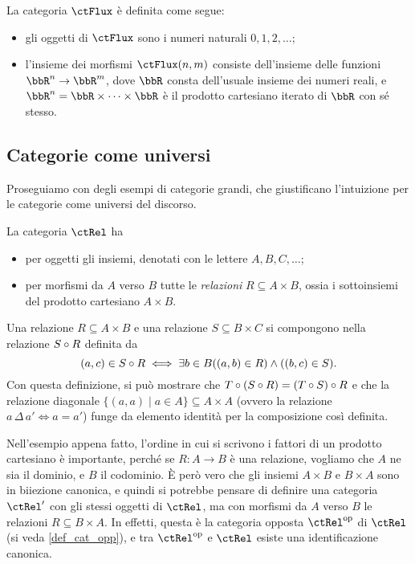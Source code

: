 \begin{example}\label{ex_cat_flusso}
	La categoria \(\ctFlux\) è definita come segue:
	\begin{itemize}
		\item gli oggetti di \(\ctFlux\) sono i numeri naturali \(0,1,2,\dots\);
		\item l'insieme dei morfismi \(\ctFlux(n,m)\) consiste dell'insieme delle funzioni \(\bbR^n\to \bbR^m\), dove \(\bbR\) consta dell'usuale insieme dei numeri reali, e \(\bbR^n = \bbR\times\dots\times\bbR\) è il prodotto cartesiano iterato di \(\bbR\) con sé stesso.
	\end{itemize}
\end{example}
\subsection{Categorie come universi}\label{ssec:categorie_universi}
Proseguiamo con degli esempi di categorie grandi, che giustificano l'intuizione per le categorie come universi del discorso.
\begin{example}\label{ex_cat_rels}
	La categoria \(\ctRel\) ha
	\begin{itemize}
		\item per oggetti gli insiemi, denotati con le lettere \(A,B,C,\dots\);
		\item per morfismi da \(A\) verso \(B\) tutte le \emph{relazioni} \(R\subseteq A\times B\), ossia i sottoinsiemi del prodotto cartesiano \(A\times B\).
	\end{itemize}
	Una relazione \(R\subseteq A\times B\) e una relazione \(S\subseteq B\times C\) si compongono nella relazione \(S\circ R\) definita da
	\[(a,c)\in S\circ R\iff \exists b\in B ((a,b)\in R)\land ((b,c)\in S).\]
	Con questa definizione, si può mostrare che \(T\circ(S\circ R)=(T\circ S)\circ R\) e che la relazione diagonale \(\{(a,a)\mid a\in A\}\subseteq A\times A\) (ovvero la relazione \(a\,\Delta\,a'\iff a=a'\)) funge da elemento identità per la composizione così definita.
\end{example}
Nell'esempio appena fatto, l'ordine in cui si scrivono i fattori di un prodotto cartesiano è importante, perché se \(R : A\to B\) è una relazione, vogliamo che \(A\) ne sia il dominio, e \(B\) il codominio. \`E però vero che gli insiemi \(A\times B\) e \(B\times A\) sono in biiezione canonica, e quindi si potrebbe pensare di definire una categoria \(\ctRel'\) con gli stessi oggetti di \(\ctRel\), ma con morfismi da \(A\) verso \(B\) le relazioni \(R\subseteq B\times A\). In effetti, questa è la categoria opposta \(\ctRel^\op\) di \(\ctRel\) (si veda \ref{def_cat_opp}), e tra \(\ctRel^\op\) e \(\ctRel\) esiste una identificazione canonica.
